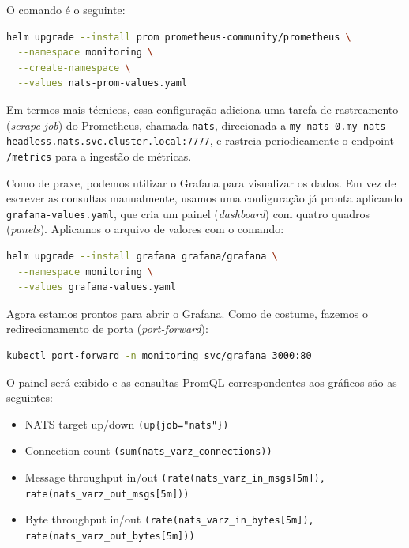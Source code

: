 \documentclass[11pt,a4paper]{article}
\begin{document}
O comando é o seguinte:

\begin{lstlisting}[language=bash]
helm upgrade --install prom prometheus-community/prometheus \
  --namespace monitoring \
  --create-namespace \
  --values nats-prom-values.yaml
\end{lstlisting}

Em termos mais técnicos, essa configuração adiciona uma tarefa de rastreamento (\textit{scrape job}) do Prometheus, chamada \texttt{nats}, direcionada a \texttt{my-nats-0.my-nats-headless.nats.svc.cluster.local:7777}, e rastreia periodicamente o endpoint \texttt{/metrics} para a ingestão de métricas.

Como de praxe, podemos utilizar o Grafana para visualizar os dados. Em vez de escrever as consultas manualmente, usamos uma configuração já pronta aplicando \texttt{grafana-values.yaml}, que cria um painel (\textit{dashboard}) com quatro quadros (\textit{panels}). Aplicamos o arquivo de valores com o comando:

\begin{lstlisting}[language=bash]
helm upgrade --install grafana grafana/grafana \
  --namespace monitoring \
  --values grafana-values.yaml
\end{lstlisting}

Agora estamos prontos para abrir o Grafana. Como de costume, fazemos o redirecionamento de porta (\textit{port-forward}):

\begin{lstlisting}[language=bash]
kubectl port-forward -n monitoring svc/grafana 3000:80
\end{lstlisting}

O painel será exibido e as consultas PromQL correspondentes aos gráficos são as seguintes:
\begin{itemize}
    \item NATS target up/down \texttt{(up\{job="nats"\})}
    \item Connection count \texttt{(sum(nats\_varz\_connections))}
    \item Message throughput in/out \texttt{(rate(nats\_varz\_in\_msgs[5m]), rate(nats\_varz\_out\_msgs[5m]))}
    \item Byte throughput in/out \texttt{(rate(nats\_varz\_in\_bytes[5m]), rate(nats\_varz\_out\_bytes[5m]))}
\end{itemize}
\end{document}

